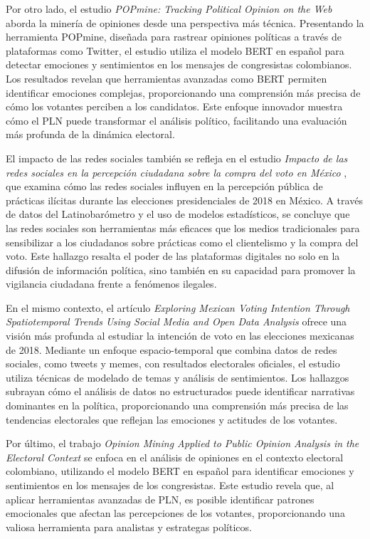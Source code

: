 \documentclass[10pt, a4paper]{article}
\begin{document}
	Por otro lado, el estudio \textit{POPmine: Tracking Political Opinion on the Web} \parencite{Perez2020} aborda la minería de opiniones desde una perspectiva más técnica. Presentando la herramienta POPmine, diseñada para rastrear opiniones políticas a través de plataformas como Twitter, el estudio utiliza el modelo BERT en español para detectar emociones y sentimientos en los mensajes de congresistas colombianos. Los resultados revelan que herramientas avanzadas como BERT permiten identificar emociones complejas, proporcionando una comprensión más precisa de cómo los votantes perciben a los candidatos. Este enfoque innovador muestra cómo el PLN puede transformar el análisis político, facilitando una evaluación más profunda de la dinámica electoral.
	
	El impacto de las redes sociales también se refleja en el estudio \textit{Impacto de las redes sociales en la percepción ciudadana sobre la compra del voto en México} \parencite{Hernandez2019}, que examina cómo las redes sociales influyen en la percepción pública de prácticas ilícitas durante las elecciones presidenciales de 2018 en México. A través de datos del Latinobarómetro y el uso de modelos estadísticos, se concluye que las redes sociales son herramientas más eficaces que los medios tradicionales para sensibilizar a los ciudadanos sobre prácticas como el clientelismo y la compra del voto. Este hallazgo resalta el poder de las plataformas digitales no solo en la difusión de información política, sino también en su capacidad para promover la vigilancia ciudadana frente a fenómenos ilegales.
	
	En el mismo contexto, el artículo \textit{Exploring Mexican Voting Intention Through Spatiotemporal Trends Using Social Media and Open Data Analysis} \parencite{Zagal2020} ofrece una visión más profunda al estudiar la intención de voto en las elecciones mexicanas de 2018. Mediante un enfoque espacio-temporal que combina datos de redes sociales, como tweets y memes, con resultados electorales oficiales, el estudio utiliza técnicas de modelado de temas y análisis de sentimientos. Los hallazgos subrayan cómo el análisis de datos no estructurados puede identificar narrativas dominantes en la política, proporcionando una comprensión más precisa de las tendencias electorales que reflejan las emociones y actitudes de los votantes.
	
	Por último, el trabajo \textit{Opinion Mining Applied to Public Opinion Analysis in the Electoral Context} \parencite{Castiblanco2022} se enfoca en el análisis de opiniones en el contexto electoral colombiano, utilizando el modelo BERT en español para identificar emociones y sentimientos en los mensajes de los congresistas. Este estudio revela que, al aplicar herramientas avanzadas de PLN, es posible identificar patrones emocionales que afectan las percepciones de los votantes, proporcionando una valiosa herramienta para analistas y estrategas políticos. 
	
\end{document}
